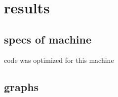 \chapter{results}



\section{specs of machine}

code was optimized for this machine

\section{graphs}
